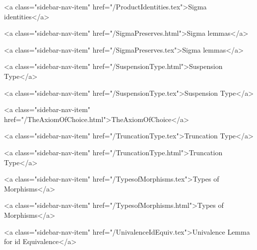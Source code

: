       
    
      
        
          <a class="sidebar-nav-item" href="/ProductIdentities.tex">Sigma identities</a>
        
      
    
      
        
          <a class="sidebar-nav-item" href="/SigmaPreserves.html">Sigma lemmas</a>
        
      
    
      
        
          <a class="sidebar-nav-item" href="/SigmaPreserves.tex">Sigma lemmas</a>
        
      
    
      
        
          <a class="sidebar-nav-item" href="/SuspensionType.html">Suspension Type</a>
        
      
    
      
        
          <a class="sidebar-nav-item" href="/SuspensionType.tex">Suspension Type</a>
        
      
    
      
        
          <a class="sidebar-nav-item" href="/TheAxiomOfChoice.html">TheAxiomOfChoice</a>
        
      
    
      
        
          <a class="sidebar-nav-item" href="/TruncationType.tex">Truncation Type</a>
        
      
    
      
        
          <a class="sidebar-nav-item" href="/TruncationType.html">Truncation Type</a>
        
      
    
      
        
          <a class="sidebar-nav-item" href="/TypesofMorphisms.tex">Types of Morphisms</a>
        
      
    
      
        
          <a class="sidebar-nav-item" href="/TypesofMorphisms.html">Types of Morphisms</a>
        
      
    
      
        
          <a class="sidebar-nav-item" href="/UnivalenceIdEquiv.tex">Univalence Lemma for id Equivalence</a>
        
